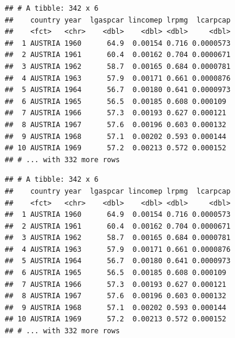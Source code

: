 \documentclass[]{gitbook}
\newenvironment{Shaded}{\begin{snugshade}}{\end{snugshade}}
\newcommand{\KeywordTok}[1]{\textcolor[rgb]{0.13,0.29,0.53}{\textbf{#1}}}
\newcommand{\NormalTok}[1]{#1}
\newcommand{\OperatorTok}[1]{\textcolor[rgb]{0.81,0.36,0.00}{\textbf{#1}}}
\newcommand{\StringTok}[1]{\textcolor[rgb]{0.31,0.60,0.02}{#1}}
\begin{document}
\begin{verbatim}
## # A tibble: 342 x 6
##    country year  lgaspcar lincomep lrpmg  lcarpcap
##    <fct>   <chr>    <dbl>    <dbl> <dbl>     <dbl>
##  1 AUSTRIA 1960      64.9  0.00154 0.716 0.0000573
##  2 AUSTRIA 1961      60.4  0.00162 0.704 0.0000671
##  3 AUSTRIA 1962      58.7  0.00165 0.684 0.0000781
##  4 AUSTRIA 1963      57.9  0.00171 0.661 0.0000876
##  5 AUSTRIA 1964      56.7  0.00180 0.641 0.0000973
##  6 AUSTRIA 1965      56.5  0.00185 0.608 0.000109 
##  7 AUSTRIA 1966      57.3  0.00193 0.627 0.000121 
##  8 AUSTRIA 1967      57.6  0.00196 0.603 0.000132 
##  9 AUSTRIA 1968      57.1  0.00202 0.593 0.000144 
## 10 AUSTRIA 1969      57.2  0.00213 0.572 0.000152 
## # ... with 332 more rows
\end{verbatim}

\begin{Shaded}
\end{Shaded}

\begin{verbatim}
## # A tibble: 342 x 6
##    country year  lgaspcar lincomep lrpmg  lcarpcap
##    <fct>   <chr>    <dbl>    <dbl> <dbl>     <dbl>
##  1 AUSTRIA 1960      64.9  0.00154 0.716 0.0000573
##  2 AUSTRIA 1961      60.4  0.00162 0.704 0.0000671
##  3 AUSTRIA 1962      58.7  0.00165 0.684 0.0000781
##  4 AUSTRIA 1963      57.9  0.00171 0.661 0.0000876
##  5 AUSTRIA 1964      56.7  0.00180 0.641 0.0000973
##  6 AUSTRIA 1965      56.5  0.00185 0.608 0.000109 
##  7 AUSTRIA 1966      57.3  0.00193 0.627 0.000121 
##  8 AUSTRIA 1967      57.6  0.00196 0.603 0.000132 
##  9 AUSTRIA 1968      57.1  0.00202 0.593 0.000144 
## 10 AUSTRIA 1969      57.2  0.00213 0.572 0.000152 
## # ... with 332 more rows
\end{verbatim}

\begin{Shaded}
\end{Shaded}
\end{document}
